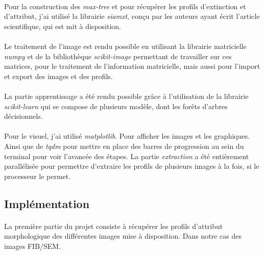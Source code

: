 \documentclass[paper=a4, 11pt]{article}
\begin{document}
\paragraph{} Pour la construction des \textit{max-tree} et pour récupérer les profils d'extinction et d'attribut, j'ai utilisé la librairie \textit{siamxt}\cite{souza2017iamxt}, conçu par les auteurs ayant écrit l'article scientifique\cite{article1}, qui est mit à disposition.

\paragraph{} Le traitement de l'image est rendu possible en utilisant la librairie matricielle \textit{numpy} et de la bibliothèque \textit{scikit-image} permettant de travailler sur ces matrices, pour le traitement de l'information matricielle, mais aussi pour l'import et export des images et des profils.

\paragraph{} La partie apprentissage a été rendu possible grâce à l'utilisation de la librairie \textit{scikit-learn} qui se compose de plusieurs modèle, dont les forêts d'arbres décisionnels.

\paragraph{} Pour le visuel, j'ai utilisé \textit{matplotlib}. Pour afficher les images et les graphiques. Ainsi que de \textit{tqdm} pour mettre en place des barres de progression au sein du terminal pour voir l'avancée des étapes. La partie \textit{extraction} a été entièrement parallélisée pour permettre d'extraire les profils de plusieurs images à la fois, si le processeur le permet.

\subsection{Implémentation}
\paragraph{} La première partie du projet consiste à récupérer les profils d'attribut morphologique des différentes images mise à disposition. Dans notre cas des images FIB/SEM. 
\end{document}
